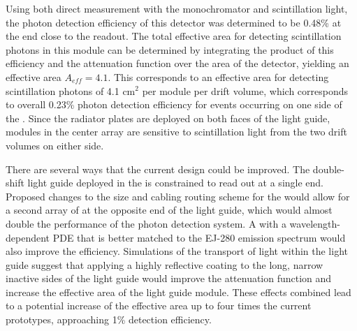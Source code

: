 Using both direct measurement with the monochromator and scintillation light, the photon detection efficiency of this detector was determined to be 0.48\% at the end close to the  readout. The total effective area for detecting  scintillation photons in this module can be determined by integrating the product of this efficiency and the attenuation function over the area of the detector, 
yielding an effective area $A_{eff}=4.1$.
This corresponds to an effective area for detecting  scintillation photons of 4.1 cm$^{2}$ per module per drift volume, which corresponds to overall 0.23\% photon detection efficiency for events occurring on one side of the .
Since the radiator plates are deployed on both faces of the light guide, modules in the center  array are sensitive to scintillation light from the two drift volumes on either side. 




There are several ways that the current design could be improved. The double-shift light guide deployed in the   is constrained to read out at a single end. Proposed changes to the  size and cabling routing scheme for the  would allow for a second array of  at the opposite end of the light guide, which would almost double the performance of the photon detection system.
A  with a wavelength-dependent PDE that is better matched to the EJ-280 emission spectrum would also improve the efficiency. Simulations of the transport of light within the light guide suggest that applying a highly reflective coating to the long, narrow inactive sides of the light guide would improve the attenuation function and increase the effective area of the light guide module. These effects combined lead to a potential increase of the effective area up to four times the current prototypes, approaching 1\% detection efficiency.

